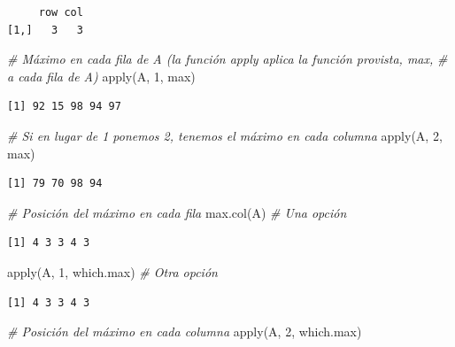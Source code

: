 \documentclass[
]{book}
\newenvironment{Shaded}{\begin{snugshade}}{\end{snugshade}}
\newcommand{\CommentTok}[1]{\textcolor[rgb]{0.56,0.35,0.01}{\textit{#1}}}
\newcommand{\DecValTok}[1]{\textcolor[rgb]{0.00,0.00,0.81}{#1}}
\newcommand{\FunctionTok}[1]{\textcolor[rgb]{0.00,0.00,0.00}{#1}}
\newcommand{\NormalTok}[1]{#1}
\begin{document}
\begin{itemize}
\begin{verbatim}
     row col
[1,]   3   3
\end{verbatim}

\begin{Shaded}
\begin{Highlighting}[]
\CommentTok{\# Máximo en cada fila de A (la función apply aplica la función provista, max, }
\CommentTok{\# a cada fila de A)}
\FunctionTok{apply}\NormalTok{(A, }\DecValTok{1}\NormalTok{, max)}
\end{Highlighting}
\end{Shaded}

\begin{verbatim}
[1] 92 15 98 94 97
\end{verbatim}

\begin{Shaded}
\begin{Highlighting}[]
\CommentTok{\# Si en lugar de 1 ponemos 2, tenemos el máximo en cada columna}
\FunctionTok{apply}\NormalTok{(A, }\DecValTok{2}\NormalTok{, max)}
\end{Highlighting}
\end{Shaded}

\begin{verbatim}
[1] 79 70 98 94
\end{verbatim}

\begin{Shaded}
\begin{Highlighting}[]
\CommentTok{\# Posición del máximo en cada fila}
\FunctionTok{max.col}\NormalTok{(A) }\CommentTok{\# Una opción}
\end{Highlighting}
\end{Shaded}

\begin{verbatim}
[1] 4 3 3 4 3
\end{verbatim}

\begin{Shaded}
\begin{Highlighting}[]
\FunctionTok{apply}\NormalTok{(A, }\DecValTok{1}\NormalTok{, which.max) }\CommentTok{\# Otra opción}
\end{Highlighting}
\end{Shaded}

\begin{verbatim}
[1] 4 3 3 4 3
\end{verbatim}

\begin{Shaded}
\begin{Highlighting}[]
\CommentTok{\# Posición del máximo en cada columna}
\FunctionTok{apply}\NormalTok{(A, }\DecValTok{2}\NormalTok{, which.max)}
\end{Highlighting}
\end{Shaded}


\end{itemize}
\end{document}
